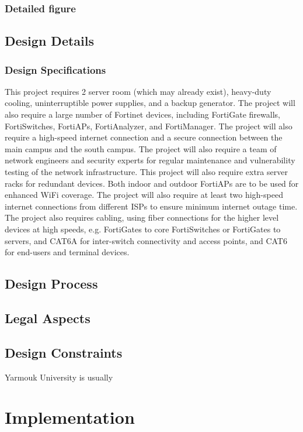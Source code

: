 \documentclass[12pt]{report}
\begin{document}
\subsection{Detailed figure}

\section{Design Details}
\subsection{Design Specifications}
This project requires 2 server room (which may already exist), heavy-duty cooling, uninterruptible power supplies, and a backup generator. The project will also require a large number of Fortinet devices, including FortiGate firewalls, FortiSwitches, FortiAPs, FortiAnalyzer, and FortiManager. The project will also require a high-speed internet connection and a secure connection between the main campus and the south campus. The project will also require a team of network engineers and security experts for regular maintenance and vulnerability testing of the network infrastructure. This project will also require extra server racks for redundant devices. Both indoor and outdoor FortiAPs are to be used for enhanced WiFi coverage. The project will also require at least two high-speed internet connections from different ISPs to ensure minimum internet outage time. The project also requires cabling, using fiber connections for the higher level devices at high speeds, e.g. FortiGates to core FortiSwitches or FortiGates to servers, and CAT6A for inter-switch connectivity and access points, and CAT6 for end-users and terminal devices.

\section{Design Process}

\section{Legal Aspects}

\section{Design Constraints}
Yarmouk University is usually 
\chapter{Implementation}
\end{document}
